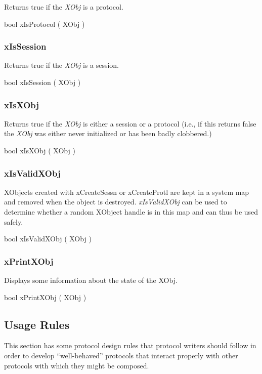 Returns true if the {\em XObj} is a protocol.
\medskip

{\sem bool} {\bold xIsProtocol} ( {\sem XObj} )



\subsubsection{xIsSession}

Returns true if the {\em XObj} is a session.
\medskip

{\sem bool} {\bold xIsSession} ( {\sem XObj} )



\subsubsection{xIsXObj}

Returns true if the {\em XObj} is either a session or a protocol
(i.e., if this returns false the {\em XObj} was either never
initialized or has been badly clobbered.)
\medskip

{\sem bool} {\bold xIsXObj} ( {\sem XObj} )



\subsubsection{xIsValidXObj}

XObjects created with xCreateSessn or xCreateProtl are kept in a
system map and removed when the object is destroyed.  
{\em xIsValidXObj} can be used to determine whether a random 
XObject handle is in this map and can thus be used safely.
\medskip

{\sem bool} {\bold xIsValidXObj} ( {\sem XObj} )


\subsubsection{xPrintXObj}

Displays some information about the state of the {\sem XObj}.
\medskip

{\sem bool} {\bold xPrintXObj} ( {\sem XObj} )



\subsection{Usage Rules}

This section has some protocol design rules that protocol writers
should follow in order to develop ``well-behaved'' protocols that
interact properly with other protocols with which they might be
composed.


